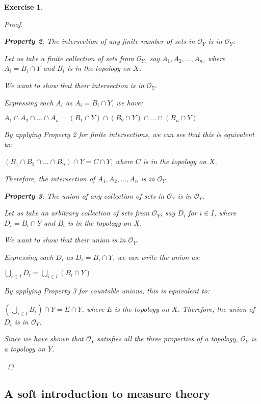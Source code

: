 \documentclass{article}
\newtheorem{exercise}{Exercise}
\begin{document}
\begin{exercise}
\begin{proof}
\begin{enumerate}
\textbf{Property 2}: The intersection of any finite number of sets in $\mathcal{O}_Y$ is in $\mathcal{O}_Y$:

Let us take a finite collection of sets from $\mathcal{O}_Y$, say $A_1, A_2, \ldots, A_n$, where $A_i = B_i \cap Y$ and $B_i$ is in the topology on $X$.

We want to show that their intersection is in $\mathcal{O}_Y$.

Expressing each $A_i$ as $A_i = B_i \cap Y$, we have:

$A_1 \cap A_2 \cap \ldots \cap A_n = (B_1 \cap Y) \cap (B_2 \cap Y) \cap \ldots \cap (B_n \cap Y)$

By applying Property 2 for finite intersections, we can see that this is equivalent to:

$(B_1 \cap B_2 \cap \ldots \cap B_n) \cap Y = C \cap Y$, where $C$ is in the topology on $X$.

Therefore, the intersection of $A_1, A_2, \ldots, A_n$ is in $\mathcal{O}_Y$.

\textbf{Property 3}: The union of any collection of sets in $\mathcal{O}_Y$ is in $\mathcal{O}_Y$.

Let us take an arbitrary collection of sets from $\mathcal{O}_Y$, say $D_i$ for $i \in I$, where $D_i = B_i \cap Y$ and $B_i$ is in the topology on $X$.

We want to show that their union is in $\mathcal{O}_Y$.

Expressing each $D_i$ as $D_i = B_i \cap Y$, we can write the union as:

$\bigcup_{i \in I} D_i = \bigcup_{i \in I} (B_i \cap Y)$

By applying Property 3 for countable unions, this is equivalent to:

$(\bigcup_{i \in I} B_i) \cap Y = E \cap Y$, where $E$ is the topology on $X$. Therefore, the union of $D_i$ is in $\mathcal{O}_Y$.

Since we have shown that $\mathcal{O}_Y$ satisfies all the three properties of a topology, $\mathcal{O}_Y$ is a topology on $Y$.


    
    \end{enumerate}
        
    \end{proof}
        
    \end{exercise}
    \subsection{A soft introduction to measure theory}
\end{document}
